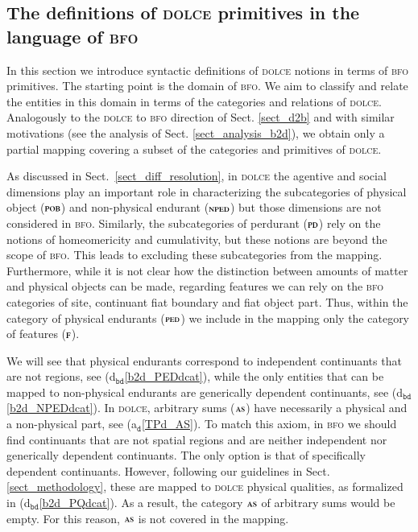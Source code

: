 \documentclass[ao]{iosart2x}
\newcommand{\bflist}{\begin{list}{}{\setlength{\topsep}{2mm}\setlength{\parsep}{0mm}\setlength{\leftmargin}{9.2mm}\setlength{\labelwidth}{8mm}}}
\newcommand{\eflist}{\end{list}}
\newcommand{\dolceAxLabel}{\textrm{a$_\texttt{d}$}}
\newcommand{\dolceAxLabelscript}{\scriptsize \textrm{a$_\texttt{d}$}}
\newcommand{\bdDefLabel}{\textrm{d$_\texttt{bd}$}}
\newcounter{cntax}
\newcommand{\dolceax}[1]{\refstepcounter{cntax}\begin{small}{\bf \dolceAxLabelscript\thecntax\label{#1}}\end{small}}
\newcommand{\refdolceax}[1]{({\dolceAxLabel}\ref{#1})}
\newcommand{\refbddf}[1]{({\bdDefLabel}\ref{#1})}
\newcommand{\pr}[1]{\mathtt{#1}}
\newcommand{\dolce}{{\textsc{dolce}}}
\newcommand{\bfo}{{\textsc{bfo}}}
\newcommand {\ASdcat} {\textsc{as}}
\newcommand {\Fdcat} {\textsc{f}}
\newcommand {\NPEDdcat} {\textsc{nped}}
\newcommand {\PDdcat} {\textsc{pd}}
\newcommand {\PEDdcat} {\textsc{ped}}
\newcommand {\POBdcat} {\textsc{pob}}
\newcommand {\TPd} {\ensuremath{\pr{tP}}}
\begin{document}
\subsection{The definitions of {\dolce} primitives in the language of {\bfo}}\label{sect_mappings_b2d}

In this section we introduce syntactic definitions of {\dolce} notions in terms of {\bfo} primitives. 
The starting point is the domain of {\bfo}. We aim to classify and relate the entities in this domain in terms of the categories and relations of {\dolce}.
Analogously to the {\dolce} to {\bfo} direction of Sect. \ref{sect_d2b} and with similar motivations (see the analysis of Sect. \ref{sect_analysis_b2d}), we obtain only a partial mapping covering a subset of the categories and primitives of {\dolce}.  

As discussed in Sect.~\ref{sect_diff_resolution}, in {\dolce} the agentive and social dimensions play an important role in characterizing the subcategories of physical object ($\POBdcat$) and non-physical endurant ($\NPEDdcat$) but those dimensions are not considered in {\bfo}. Similarly, the subcategories of perdurant ($\PDdcat$) rely on the notions of homeomericity and cumulativity, but these notions are beyond the scope of {\bfo}. This leads to excluding these subcategories from the mapping. Furthermore, while it is not clear how the distinction between amounts of matter and physical objects can be made, regarding features we can rely on the {\bfo} categories of site, continuant fiat boundary and fiat object part. Thus, within the category of physical endurants ($\PEDdcat$) we include in the mapping only the category of features ($\Fdcat$). 

We will see that physical endurants correspond to independent continuants that are not regions,
see \refbddf{b2d_PEDdcat}, while the only entities that can be mapped to non-physical endurants are generically dependent continuants, see \refbddf{b2d_NPEDdcat}. In {\dolce}, arbitrary sums ($\ASdcat$) have necessarily a physical and a non-physical part, see \refdolceax{TPd_AS}. To match this axiom, in {\bfo} we should find continuants that are not spatial regions and are neither independent nor generically dependent continuants. The only option is that of specifically dependent continuants. However, following our guidelines in Sect. \ref{sect_methodology}, these are mapped to {\dolce} physical qualities, as formalized in \refbddf{b2d_PQdcat}. As a result, the category $\ASdcat$ of arbitrary sums would be empty. For this reason, $\ASdcat$ is not covered in the mapping.   
\end{document}
